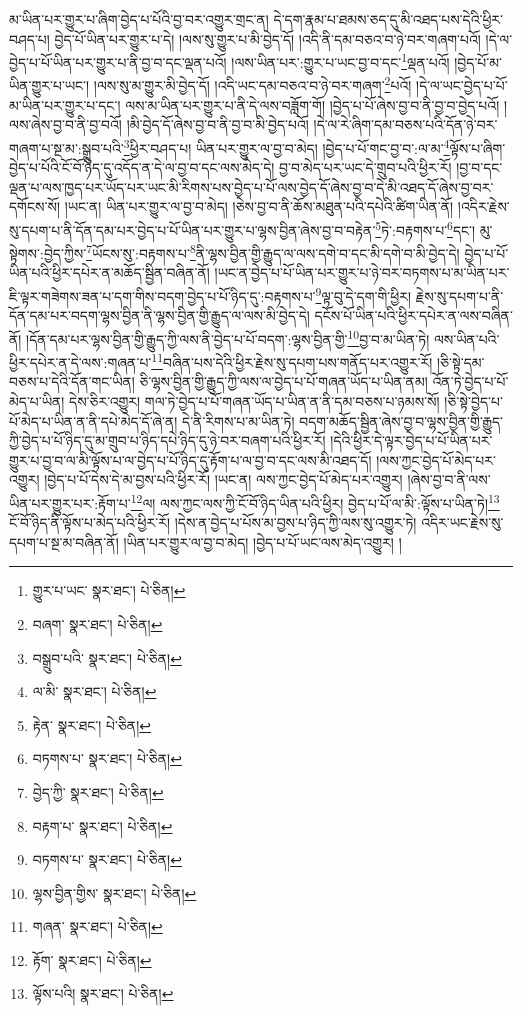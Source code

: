 མ་ཡིན་པར་གྱུར་པ་ཞིག་བྱེད་པ་པོའི་བྱ་བར་འགྱུར་གྲང་ན། དེ་དག་རྣམ་པ་ཐམས་ཅད་དུ་མི་འཐད་པས་དེའི་ཕྱིར་བཤད་པ། བྱེད་པོ་ཡིན་པར་གྱུར་པ་དེ། །ལས་སུ་གྱུར་པ་མི་བྱེད་དོ། །འདི་ནི་དམ་བཅའ་བ་ཉེ་བར་གཞག་པའོ། །དེ་ལ་བྱེད་པ་པོ་ཡིན་པར་གྱུར་པ་ནི་བྱ་བ་དང་ལྡན་པའོ། །ལས་ཡིན་པར་:གྱུར་པ་ཡང་བྱ་བ་དང་\footnote{གྱུར་པ་ཡང་  སྣར་ཐང་།  པེ་ཅིན། }ལྡན་པའོ། །བྱེད་པོ་མ་ཡིན་གྱུར་པ་ཡང་། །ལས་སུ་མ་གྱུར་མི་བྱེད་དོ། །འདི་ཡང་དམ་བཅའ་བ་ཉེ་བར་གཞག་\footnote{བཞག་  སྣར་ཐང་།  པེ་ཅིན། }པའོ། །དེ་ལ་ཡང་བྱེད་པ་པོ་མ་ཡིན་པར་གྱུར་པ་དང་། ལས་མ་ཡིན་པར་གྱུར་པ་ནི་དེ་ལས་བཟློག་གོ། །བྱེད་པ་པོ་ཞེས་བྱ་བ་ནི་བྱ་བ་བྱེད་པའོ། །ལས་ཞེས་བྱ་བ་ནི་བྱ་བའོ། །མི་བྱེད་དོ་ཞེས་བྱ་བ་ནི་བྱ་བ་མི་བྱེད་པའོ། །དེ་ལ་རེ་ཞིག་དམ་བཅས་པའི་དོན་ཉེ་བར་གཞག་པ་སྔ་མ་:སྒྲུབ་པའི་\footnote{བསྒྲུབ་པའི་  སྣར་ཐང་།  པེ་ཅིན། }ཕྱིར་བཤད་པ། ཡིན་པར་གྱུར་ལ་བྱ་བ་མེད། །བྱེད་པ་པོ་གང་བྱ་བ་:ལ་མ་\footnote{ལ་མི་  སྣར་ཐང་།  པེ་ཅིན། }ལྟོས་པ་ཞིག་བྱེད་པ་པོའི་ངོ་བོ་ཉིད་དུ་འདོད་ན་དེ་ལ་བྱ་བ་དང་ལས་མེད་དེ། བྱ་བ་མེད་པར་ཡང་དེ་གྲུབ་པའི་ཕྱིར་རོ། །བྱ་བ་དང་ལྡན་པ་ལས་ཁྱད་པར་ཡོད་པར་ཡང་མི་རིགས་པས་བྱེད་པ་པོ་ལས་བྱེད་དོ་ཞེས་བྱ་བ་དེ་མི་འཐད་དོ་ཞེས་བྱ་བར་དགོངས་སོ། །ཡང་ན། ཡིན་པར་གྱུར་ལ་བྱ་བ་མེད། །ཅེས་བྱ་བ་ནི་ཆོས་མཐུན་པའི་དཔེའི་ཚིག་ཡིན་ནོ། །འདིར་རྗེས་སུ་དཔག་པ་ནི་དོན་དམ་པར་བྱེད་པ་པོ་ཡིན་པར་གྱུར་པ་ལྷས་བྱིན་ཞེས་བྱ་བ་བརྟེན་\footnote{རྟེན་  སྣར་ཐང་།  པེ་ཅིན། }ཏེ་:བརྟགས་པ་\footnote{བཏགས་པ་  སྣར་ཐང་།  པེ་ཅིན། }དང་། མུ་སྟེགས་:བྱེད་ཀྱིས་\footnote{བྱེད་ཀྱི་  སྣར་ཐང་།  པེ་ཅིན། }ཡོངས་སུ་:བརྟགས་པ་\footnote{བརྟག་པ་  སྣར་ཐང་།  པེ་ཅིན། }ནི་ལྷས་བྱིན་གྱི་རྒྱུད་ལ་ལས་དགེ་བ་དང་མི་དགེ་བ་མི་བྱེད་དེ། བྱེད་པ་པོ་ཡིན་པའི་ཕྱིར་དཔེར་ན་མཆོད་སྦྱིན་བཞིན་ནོ། །ཡང་ན་བྱེད་པ་པོ་ཡིན་པར་གྱུར་པ་ཉེ་བར་བཏགས་པ་མ་ཡིན་པར་ཇི་ལྟར་གཟེགས་ཟན་པ་དག་གིས་བདག་བྱེད་པ་པོ་ཉིད་དུ་:བརྟགས་པ་\footnote{བཏགས་པ་  སྣར་ཐང་།  པེ་ཅིན། }ལྟ་བུ་དེ་དག་གི་ཕྱིར། རྗེས་སུ་དཔག་པ་ནི་དོན་དམ་པར་བདག་ལྷས་བྱིན་ནི་ལྷས་བྱིན་གྱི་རྒྱུད་ལ་ལས་མི་བྱེད་དེ། དངོས་པོ་ཡིན་པའི་ཕྱིར་དཔེར་ན་ལས་བཞིན་ནོ། །དོན་དམ་པར་ལྷས་བྱིན་གྱི་རྒྱུད་ཀྱི་ལས་ནི་བྱེད་པ་པོ་བདག་:ལྷས་བྱིན་གྱི་\footnote{ལྷས་བྱིན་གྱིས་  སྣར་ཐང་།  པེ་ཅིན། }བྱ་བ་མ་ཡིན་ཏེ། ལས་ཡིན་པའི་ཕྱིར་དཔེར་ན་དེ་ལས་:གཞན་པ་\footnote{གཞན་  སྣར་ཐང་།  པེ་ཅིན། }བཞིན་པས་དེའི་ཕྱིར་རྗེས་སུ་དཔག་པས་གནོད་པར་འགྱུར་རོ། །ཅི་སྟེ་དམ་བཅས་པ་དེའི་དོན་གང་ཡིན། ཅི་ལྷས་བྱིན་གྱི་རྒྱུད་ཀྱི་ལས་ལ་བྱེད་པ་པོ་གཞན་ཡོད་པ་ཡིན་ནམ། འོན་ཏེ་བྱེད་པ་པོ་མེད་པ་ཡིན། དེས་ཅིར་འགྱུར། གལ་ཏེ་བྱེད་པ་པོ་གཞན་ཡོད་པ་ཡིན་ན་ནི་དམ་བཅས་པ་ཉམས་སོ། །ཅི་སྟེ་བྱེད་པ་པོ་མེད་པ་ཡིན་ན་ནི་དཔེ་མེད་དོ་ཞེ་ན། དེ་ནི་རིགས་པ་མ་ཡིན་ཏེ། བདག་མཆོད་སྦྱིན་ཞེས་བྱ་བ་ལྷས་བྱིན་གྱི་རྒྱུད་ཀྱི་བྱེད་པ་པོ་ཉིད་དུ་མ་གྲུབ་པ་ཉིད་དཔེ་ཉིད་དུ་ཉེ་བར་བཞག་པའི་ཕྱིར་རོ། །དེའི་ཕྱིར་དེ་ལྟར་བྱེད་པ་པོ་ཡིན་པར་གྱུར་པ་བྱ་བ་ལ་མི་ལྟོས་པ་ལ་བྱེད་པ་པོ་ཉིད་དུ་རྟོག་པ་ལ་བྱ་བ་དང་ལས་མི་འཐད་དོ། །ལས་ཀྱང་བྱེད་པོ་མེད་པར་འགྱུར། །བྱེད་པ་པོ་དེས་དེ་མ་བྱས་པའི་ཕྱིར་རོ། །ཡང་ན། ལས་ཀྱང་བྱེད་པོ་མེད་པར་འགྱུར། །ཞེས་བྱ་བ་ནི་ལས་ཡིན་པར་གྱུར་པར་:རྟོག་པ་\footnote{རྟོག་  སྣར་ཐང་།  པེ་ཅིན། }ལ། ལས་ཀྱང་ལས་ཀྱི་ངོ་བོ་ཉིད་ཡིན་པའི་ཕྱིར། བྱེད་པ་པོ་ལ་མི་:ལྟོས་པ་ཡིན་ཏེ།\footnote{ལྟོས་པའི།  སྣར་ཐང་།  པེ་ཅིན། } ངོ་བོ་ཉིད་ནི་ལྟོས་པ་མེད་པའི་ཕྱིར་རོ། །དེས་ན་བྱེད་པ་པོས་མ་བྱས་པ་ཉིད་ཀྱི་ལས་སུ་འགྱུར་ཏེ། འདིར་ཡང་རྗེས་སུ་དཔག་པ་སྔ་མ་བཞིན་ནོ། །ཡིན་པར་གྱུར་ལ་བྱ་བ་མེད། །བྱེད་པ་པོ་ཡང་ལས་མེད་འགྱུར། །
